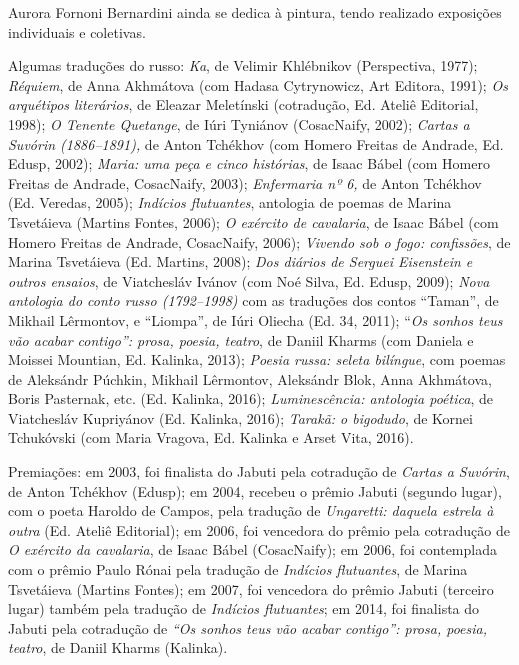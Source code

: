 Aurora Fornoni Bernardini ainda se dedica à pintura, tendo realizado
exposições individuais e coletivas.

Algumas traduções do russo: \emph{Ka}, de Velimir Khlébnikov
(Perspectiva, 1977); \emph{Réquiem}, de Anna Akhmátova (com Hadasa
Cytrynowicz, Art Editora, 1991); \emph{Os arquétipos literários}, de
Eleazar Meletínski (cotradução, Ed. Ateliê Editorial, 1998); \emph{O
Tenente Quetange}, de Iúri Tyniánov (CosacNaify, 2002); \emph{Cartas a
Suvórin (1886--1891),} de Anton Tchékhov (com Homero Freitas de Andrade,
Ed. Edusp, 2002); \emph{Maria: uma peça e cinco histórias}, de Isaac
Bábel (com Homero Freitas de Andrade, CosacNaify, 2003);
\emph{Enfermaria nº 6,} de Anton Tchékhov (Ed. Veredas, 2005);
\emph{Indícios flutuantes}, antologia de poemas de Marina Tsvetáieva
(Martins Fontes, 2006); \emph{O exército de cavalaria}, de Isaac Bábel
(com Homero Freitas de Andrade, CosacNaify, 2006); \emph{Vivendo sob o
fogo: confissões}, de Marina Tsvetáieva (Ed. Martins, 2008); \emph{Dos
diários de Serguei Eisenstein e outros ensaios}, de Viatchesláv Ivánov
(com Noé Silva, Ed. Edusp, 2009); \emph{Nova antologia do conto russo
(1792--1998)} com as traduções dos contos ``Taman'', de Mikhail
Lêrmontov, e ``Liompa'', de Iúri Oliecha (Ed. 34, 2011); ``\emph{Os
sonhos teus vão acabar contigo'': prosa, poesia, teatro}, de Daniil
Kharms (com Daniela e Moissei Mountian, Ed. Kalinka, 2013); \emph{Poesia
russa: seleta bilíngue}, com poemas de Aleksándr Púchkin, Mikhail
Lêrmontov, Aleksándr Blok, Anna Akhmátova, Boris Pasternak, etc. (Ed.
Kalinka, 2016); \emph{Luminescência: antologia poética}, de Viatchesláv
Kupriyánov (Ed. Kalinka, 2016); \emph{Tarakã: o bigodudo}, de Kornei
Tchukóvski (com Maria Vragova, Ed. Kalinka e Arset Vita, 2016).

Premiações: em 2003, foi finalista do Jabuti pela cotradução de
\emph{Cartas a Suvórin}, de Anton Tchékhov (Edusp); em 2004, recebeu o
prêmio Jabuti (segundo lugar), com o poeta Haroldo de Campos, pela
tradução de \emph{Ungaretti: daquela estrela à outra} (Ed. Ateliê
Editorial); em 2006, foi vencedora do prêmio  pela cotradução de
\emph{O exército da cavalaria}, de Isaac Bábel (CosacNaify); em 2006,
foi contemplada com o prêmio Paulo Rónai pela tradução de \emph{Indícios
flutuantes}, de Marina Tsvetáieva (Martins Fontes); em 2007, foi
vencedora do prêmio Jabuti (terceiro lugar) também pela tradução de
\emph{Indícios flutuantes}; em 2014, foi finalista do Jabuti pela
cotradução de \emph{``Os sonhos teus vão acabar contigo'': prosa,
poesia, teatro}, de Daniil Kharms (Kalinka).

